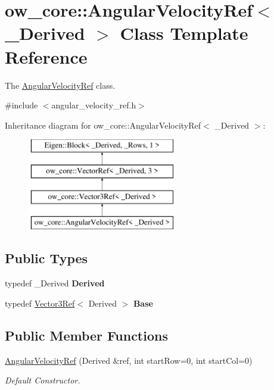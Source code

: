 \hypertarget{classow__core_1_1AngularVelocityRef}{}\section{ow\+\_\+core\+:\+:Angular\+Velocity\+Ref$<$ \+\_\+\+Derived $>$ Class Template Reference}
\label{classow__core_1_1AngularVelocityRef}


The \hyperlink{classow__core_1_1AngularVelocityRef}{Angular\+Velocity\+Ref} class.  




{\ttfamily \#include $<$angular\+\_\+velocity\+\_\+ref.\+h$>$}

Inheritance diagram for ow\+\_\+core\+:\+:Angular\+Velocity\+Ref$<$ \+\_\+\+Derived $>$\+:\begin{figure}[H]
\begin{center}
\leavevmode
\includegraphics[height=4.000000cm]{de/d7d/classow__core_1_1AngularVelocityRef}
\end{center}
\end{figure}
\subsection*{Public Types}
\begin{DoxyCompactItemize}
\item 
typedef \+\_\+\+Derived {\bfseries Derived}\hypertarget{classow__core_1_1AngularVelocityRef_a05048cc839f03a8b0a013fd5b92aec21}{}\label{classow__core_1_1AngularVelocityRef_a05048cc839f03a8b0a013fd5b92aec21}

\item 
typedef \hyperlink{classow__core_1_1Vector3Ref}{Vector3\+Ref}$<$ Derived $>$ {\bfseries Base}\hypertarget{classow__core_1_1AngularVelocityRef_af26b8bcb21042e6a777eb35a59f4ee2a}{}\label{classow__core_1_1AngularVelocityRef_af26b8bcb21042e6a777eb35a59f4ee2a}

\end{DoxyCompactItemize}
\subsection*{Public Member Functions}
\begin{DoxyCompactItemize}
\item 
\hyperlink{classow__core_1_1AngularVelocityRef_a683f548b84149917945be19fcf197fca}{Angular\+Velocity\+Ref} (Derived \&ref, int start\+Row=0, int start\+Col=0)
\begin{DoxyCompactList}\small\item\em Default Constructor. \end{DoxyCompactList}\end{DoxyCompactItemize}


